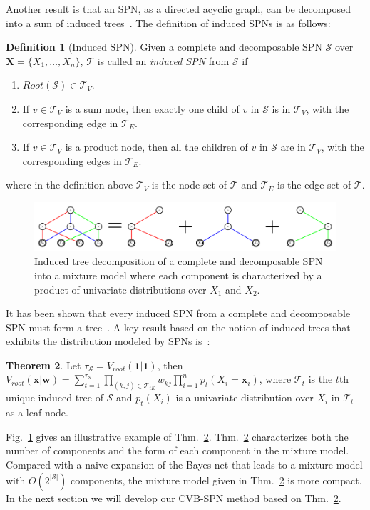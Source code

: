 \documentclass{article} %
\theoremstyle{definition}
\newtheorem{theorem}{Theorem}
\newtheorem{definition}[theorem]{Definition}
\begin{document}
Another result is that an SPN, as a directed acyclic graph, can be decomposed into a sum of induced trees~\cite{zhao2015unifying}. The definition of induced SPNs is as follows:
\begin{definition}[Induced SPN]
\label{def:treespn}
Given a complete and decomposable SPN $\mathcal{S}$ over $\mathbf{X}= \{X_1,\ldots, X_n\}$, $\mathcal{T}$ is called an \emph{induced SPN} from $\mathcal{S}$ if 
\begin{enumerate}
	\item 	$Root(\mathcal{S})\in\mathcal{T}_V$.
	\item 	If $v\in\mathcal{T}_V$ is a sum node, then exactly one child of $v$ in $\mathcal{S}$ is in $\mathcal{T}_V$, with the corresponding edge in $\mathcal{T}_E$.
	\item 	If $v\in\mathcal{T}_V$ is a product node, then all the children of $v$ in $\mathcal{S}$ are in $\mathcal{T}_V$, with the corresponding edges in $\mathcal{T}_E$.
\end{enumerate}
where in the definition above $\mathcal{T}_V$ is the node set of $\mathcal{T}$ and $\mathcal{T}_E$ is the edge set of $\mathcal{T}$.
\end{definition}
\begin{figure}[htb]
\centering
	\includegraphics[width=\linewidth]{figures/spntrees.pdf}
\caption{Induced tree decomposition of a complete and decomposable SPN into a mixture model where each component is characterized by a product of univariate distributions over $X_1$ and $X_2$.}
\label{fig:spntrees}
\end{figure}
It has been shown that every induced SPN from a complete and decomposable SPN must form a tree~\cite{zhao2015unifying}. A key result based on the notion of induced trees that exhibits the distribution modeled by SPNs is~\cite{zhao2015unifying}:
\begin{theorem}
\label{thm:polynomial}
Let $\tau_\mathcal{S} = V_{root}(\mathbf{1}|\mathbf{1})$, then $V_{root}(\mathbf{x}|\mathbf{w}) = \sum_{t=1}^{\tau_\mathcal{S}}\prod_{(k, j)\in\mathcal{T}_{tE}}w_{kj}\prod_{i=1}^n p_t(X_i = \mathbf{x}_i)$, where $\mathcal{T}_t$ is the $t$th unique induced tree of $\mathcal{S}$ and $p_t(X_i)$ is a univariate distribution over $X_i$ in $\mathcal{T}_t$ as a leaf node.
\end{theorem}
Fig.~\ref{fig:spntrees} gives an illustrative example of Thm.~\ref{thm:polynomial}. Thm.~\ref{thm:polynomial} characterizes both the number of components and the form of each component in the mixture model. Compared with a naive expansion of the Bayes net that leads to a mixture model with $O(2^{|\mathcal{S}|})$ components, the mixture model given in Thm.~\ref{thm:polynomial} is more compact. In the next section we will develop our CVB-SPN method based on Thm.~\ref{thm:polynomial}.
\end{document}
